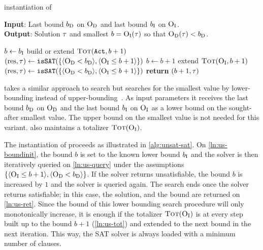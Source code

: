 \begin{algorithm}[t]
  \caption{\unsatsat{} instantiation of \Min{}}\label{alg:unsat-sat}
  \textbf{Input}: Last bound $b_{\text{D}}$ on $\textsc{O}_{\text{D}}$ and last bound $b_{\text{I}}$ on $\textsc{O}_{\text{I}}$. \\
  \textbf{Output}: Solution $\tau$ and smallest $b=\textsc{O}_{\text{I}}(\tau)$ so that $\textsc{O}_{\text{D}}(\tau)<b_{\text{D}}$.

  \begin{algorithmic}[1]
    \STATE $b \gets b_{\text{I}}$ \label{ln:us-boundinit}
    \STATE build or extend $\textsc{Tot}(\texttt{Act},b+1)$
    \STATE $(\text{res},\tau) \gets \texttt{isSAT}(\{\langle \textsc{O}_{\text{D}} < b_{\text{D}} \rangle, \langle \textsc{O}_{\text{I}} \leq b+1 \rangle\})$
    \WHILE{$\res = \unsat$}
      \STATE $b \gets b+1$
      \STATE extend $\textsc{Tot}(\textsc{O}_{\text{I}},b+1)$ \label{ln:us-tot}
      \STATE $(\text{res},\tau) \gets \texttt{isSAT}(\{\langle \textsc{O}_{\text{D}} < b_{\text{D}} \rangle, \langle \textsc{O}_{\text{I}} \leq b+1 \rangle\})$ \label{ln:us-query}
    \ENDWHILE
    \STATE \textbf{return} $(b+1,\tau)$ \label{ln:us-ret}
  \end{algorithmic}
\end{algorithm}

\unsatsat{} takes a similar approach to \satunsat{} search but searches for the smallest value by lower-bounding instead of upper-bounding~\autocite{DBLP:conf/sat/FuM06}.
As input parameters it receives the last bound $b_{\text{D}}$ on $\textsc{O}_{\text{D}}$ and the last bound $b_{\text{I}}$ on $\textsc{O}_{\text{I}}$ as a lower bound on the sought-after smallest value.
The upper bound on the smallest value is not needed for this variant.
\unsatsat{} also maintains a totalizer $\textsc{Tot}(\textsc{O}_{\text{I}})$.

The \unsatsat{} instantiation of \Min{} proceeds as illustrated in \cref{alg:unsat-sat}.
On \cref{ln:us-boundinit}, the bound $b$ is set to the known lower bound $b_{\text{I}}$ and the solver is then iteratively queried on \cref{ln:us-query} under the assumptions $\{ \langle \textsc{O}_{\text{I}} \leq b+1 \rangle, \langle \textsc{O}_{\text{D}} < b_{\text{D}} \rangle \}$.
If the solver returns unsatisfiable, the bound $b$ is increased by $1$ and the solver is queried again.
The search ends once the solver returns satisfiable;
in this case, the solution, and the bound are returned on \cref{ln:us-ret}.
Since the bound of this lower bounding search procedure will only monotonically increase, it is enough if the totalizer $\textsc{Tot}(\textsc{O}_{\text{I}})$ is at every step built up to the bound $b+1$ (\cref{ln:us-tot}) and extended to the next bound in the next iteration.
This way, the SAT solver is always loaded with a minimum number of clauses.

